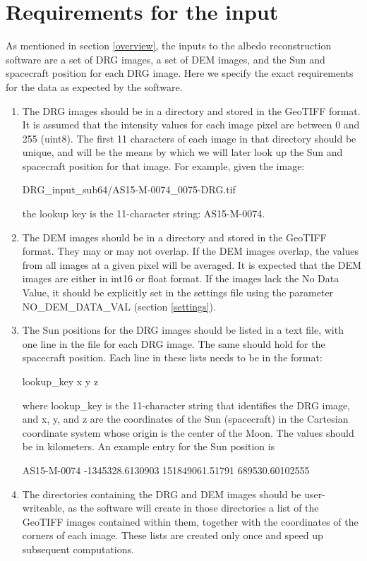 \documentclass[letterpaper,fleqn,11pt]{report}
\begin{document}
\section{Requirements for the input}\label{requirements}

As mentioned in section \ref{overview}, the inputs to the albedo reconstruction software are a set of DRG images, a set of DEM images, and the Sun and spacecraft position for each DRG image. Here we specify the exact requirements for the data as expected by the software.

\begin{enumerate}

\item The DRG images should be in a directory and stored in the GeoTIFF format. It is assumed that the intensity values for each image pixel are between 0 and 255 (uint8).  The first 11 characters of each image in that directory should be unique, and will be the means by which we will later look up the Sun and spacecraft position for that image. For example, given the image:

DRG\_input\_sub64/AS15-M-0074\_0075-DRG.tif

the lookup key is the 11-character string: AS15-M-0074.

\item The DEM images should be in a directory and stored in the GeoTIFF
format. They may or may not overlap. If the DEM images overlap, the
values from all images at a given pixel will be averaged. It is expected
that the DEM images are either in int16 or float format. If the
images lack the No Data Value, it should be explicitly set in the
settings file using the parameter NO\_DEM\_DATA\_VAL (section \ref{settings}).

\item The Sun positions for the DRG images should be listed in a text file,
 with one line in the file for each DRG image. The same should
hold for the spacecraft position. Each line in these lists needs to
be in the format: 

lookup\_key x y z

where lookup\_key is the 11-character string that identifies the DRG
image, and x, y, and z are the coordinates of the Sun (spacecraft)
 in the Cartesian coordinate system whose origin is the center of the
 Moon. The values should be in kilometers. An example entry for the Sun
 position is 

AS15-M-0074 -1345328.6130903 151849061.51791 689530.60102555

\item The directories containing the DRG and DEM images should be
  user-writeable, as the software will create in those directories a
  list of the GeoTIFF images contained within them, together with the
  coordinates of the corners of each image. These lists are created
  only once and speed up subsequent computations.

\end{enumerate}
\end{document}
